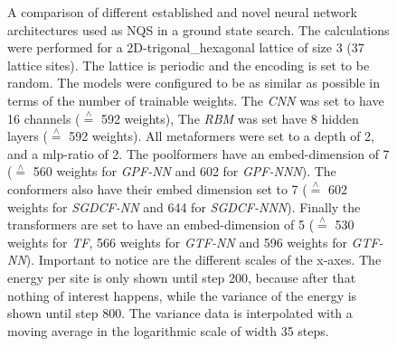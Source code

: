 \begin{figure}[htbp]
    \centering
    \caption{A comparison of different established and novel neural network architectures used as NQS in a ground state search.
        The calculations were performed for a 2D-trigonal\_hexagonal lattice of size 3 (37 lattice sites).
        The lattice is periodic and the encoding is set to be random.
        The models were configured to be as similar as possible in terms of the number of trainable weights.
        The \emph{CNN} was set to have 16 channels ($\stackrel{\wedge}{=}$ 592 weights), The \emph{RBM} was set have 8 hidden layers ($\stackrel{\wedge}{=}$ 592 weights). 
        All metaformers were set to a depth of 2, and a mlp-ratio of 2.
        The poolformers have an embed-dimension of 7 ($\stackrel{\wedge}{=}$ 560 weights for \emph{GPF-NN} and 602 for \emph{GPF-NNN}).
        The conformers also have their embed dimension set to 7 ($\stackrel{\wedge}{=}$ 602 weights for \emph{SGDCF-NN} and 644 for \emph{SGDCF-NNN}).
        Finally the transformers are set to have an embed-dimension of 5 ($\stackrel{\wedge}{=}$ 530 weights for \emph{TF}, 566 weights for \emph{GTF-NN} and 596 weights for \emph{GTF-NN}). 
        Important to notice are the different scales of the x-axes.
        The energy per site is only shown until step 200, because after that nothing of interest happens, while the variance of the energy is shown until step 800.  
        The variance data is interpolated with a moving average in the logarithmic scale of width 35 steps.
    }
    \label{fig:gss-architectures-comp}
\end{figure}

